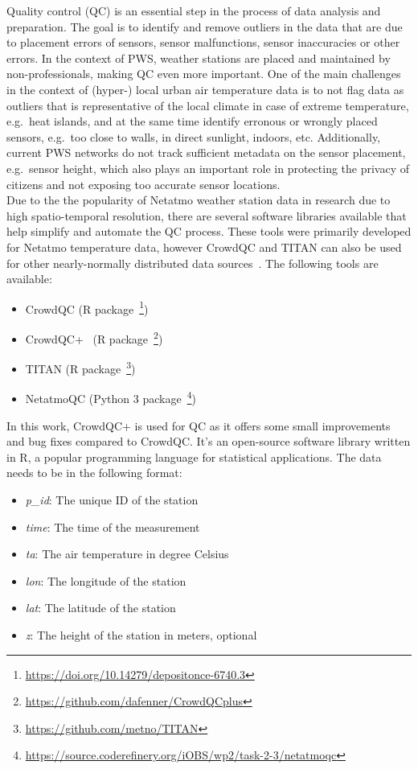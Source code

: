 Quality control (QC) is an essential step in the process of data analysis and preparation. The goal is to identify and remove outliers in the data that are due to placement errors of sensors, sensor malfunctions, sensor inaccuracies or other errors. In the context of PWS, weather stations are placed and maintained by non-professionals, making QC even more important. One of the main challenges in the context of (hyper-) local urban air temperature data is to not flag data as outliers that is representative of the local climate in case of extreme temperature, e.g.\ heat islands, and at the same time identify erronous or wrongly placed sensors, e.g.\ too close to walls, in direct sunlight, indoors, etc. Additionally, current PWS networks do not track sufficient metadata on the sensor placement, e.g.\ sensor height, which also plays an important role in protecting the privacy of citizens and not exposing too accurate sensor locations.\\
Due to the the popularity of Netatmo weather station data in research due to high spatio-temporal resolution, there are several software libraries available that help simplify and automate the QC process. These tools were primarily developed for Netatmo temperature data, however CrowdQC and TITAN can also be used for other nearly-normally distributed data sources~\cite{hahn2022observations}. The following tools are available:

\begin{itemize}
    \item CrowdQC (R package~\footnote{\url{https://doi.org/10.14279/depositonce-6740.3}})
    \item CrowdQC+~\cite{fenner2021crowdqc+} (R package~\footnote{\url{https://github.com/dafenner/CrowdQCplus}})
    \item TITAN (R package~\footnote{\url{https://github.com/metno/TITAN}})
    \item NetatmoQC (Python 3 package~\footnote{\url{https://source.coderefinery.org/iOBS/wp2/task-2-3/netatmoqc}})
\end{itemize}


In this work, CrowdQC+ is used for QC as it offers some small improvements and bug fixes compared to CrowdQC. It's an open-source software library written in R, a popular programming language for statistical applications. The data needs to be in the following format:

\begin{itemize}
    \item \textit{p\_id}: The unique ID of the station
    \item \textit{time}: The time of the measurement
    \item \textit{ta}: The air temperature in degree Celsius
    \item \textit{lon}: The longitude of the station
    \item \textit{lat}: The latitude of the station
    \item \textit{z}: The height of the station in meters, optional
\end{itemize}


